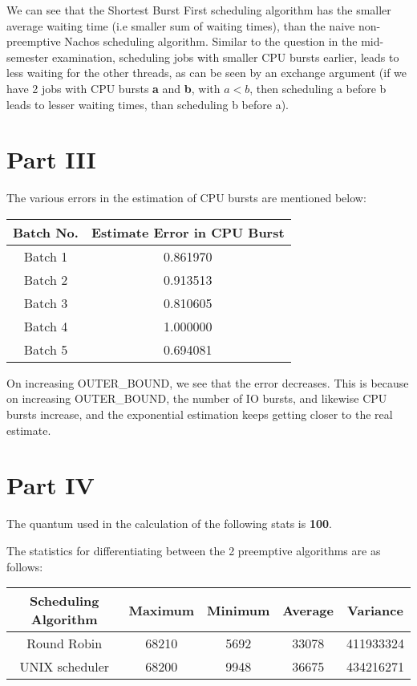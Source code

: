 \documentclass[]{article}
\begin{document}
We can see that the Shortest Burst First scheduling algorithm has the smaller average waiting time (i.e smaller sum of waiting times), than the naive non-preemptive Nachos scheduling algorithm. Similar to the question in the mid-semester examination, scheduling jobs with smaller CPU bursts earlier, leads to less waiting for the other threads, as can be seen by an exchange argument (if we have 2 jobs with CPU bursts \textbf{a} and \textbf{b}, with $a<b$, then scheduling a before b leads to lesser waiting times, than scheduling b before a).

\pagebreak
\section{Part III}

The various errors in the estimation of CPU bursts are mentioned below:

\begin{center}
\begin{tabular}{|c|c|}
\hline
Batch No.& Estimate Error in CPU Burst\\
\hline
Batch 1 & 0.861970\\
Batch 2 & 0.913513\\
Batch 3 & 0.810605\\
Batch 4 & 1.000000\\
Batch 5 & 0.694081\\
\hline
\end{tabular}
\end{center}

On increasing OUTER\_BOUND, we see that the error decreases. This is because on increasing OUTER\_BOUND, the number of IO bursts, and likewise CPU bursts increase, and the exponential estimation keeps getting closer to the real estimate.

\section{Part IV}

The quantum used in the calculation of the following stats is \textbf{100}.

The statistics for differentiating between the 2 preemptive algorithms are as follows:

\begin{center}
\begin{tabular}{|c|c|c|c|c|}
\hline
Scheduling Algorithm& Maximum& Minimum& Average& Variance\\
\hline
Round Robin& 68210& 5692& 33078& 411933324\\
\hline
UNIX scheduler& 68200& 9948& 36675& 434216271\\
\hline
\end{tabular}
\end{center}
\end{document}
